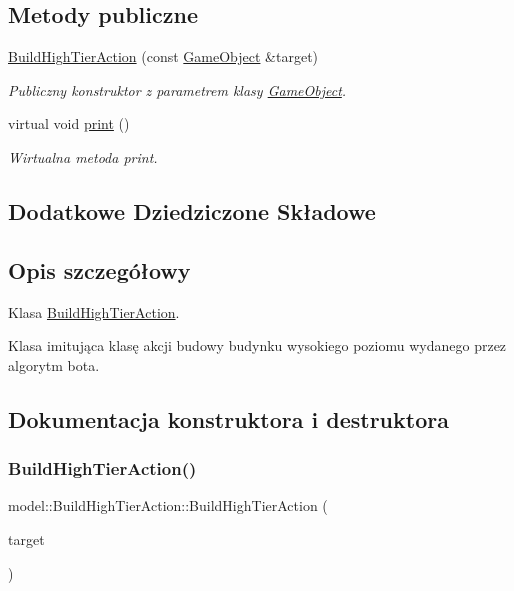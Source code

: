 \subsection*{Metody publiczne}
\begin{DoxyCompactItemize}
\item 
\hyperlink{classmodel_1_1BuildHighTierAction_ae5b303402353343b947efba4ef9cd62d}{Build\+High\+Tier\+Action} (const \hyperlink{classmodel_1_1GameObject}{Game\+Object} \&target)
\begin{DoxyCompactList}\small\item\em Publiczny konstruktor z parametrem klasy \hyperlink{classmodel_1_1GameObject}{Game\+Object}. \end{DoxyCompactList}\item 
virtual void \hyperlink{classmodel_1_1BuildHighTierAction_a587f7c8efb015bbc00cb706e7e289edf}{print} ()
\begin{DoxyCompactList}\small\item\em Wirtualna metoda print. \end{DoxyCompactList}\end{DoxyCompactItemize}
\subsection*{Dodatkowe Dziedziczone Składowe}


\subsection{Opis szczegółowy}
Klasa \hyperlink{classmodel_1_1BuildHighTierAction}{Build\+High\+Tier\+Action}. 

Klasa imitująca klasę akcji budowy budynku wysokiego poziomu wydanego przez algorytm bota. 

\subsection{Dokumentacja konstruktora i destruktora}
\mbox{\label{classmodel_1_1BuildHighTierAction_ae5b303402353343b947efba4ef9cd62d}} 
\subsubsection{\texorpdfstring{Build\+High\+Tier\+Action()}{BuildHighTierAction()}}
{\footnotesize\ttfamily model\+::\+Build\+High\+Tier\+Action\+::\+Build\+High\+Tier\+Action (\begin{DoxyParamCaption}\item[{const \hyperlink{classmodel_1_1GameObject}{Game\+Object} \&}]{target }\end{DoxyParamCaption})\hspace{0.3cm}{\ttfamily [inline]}}



